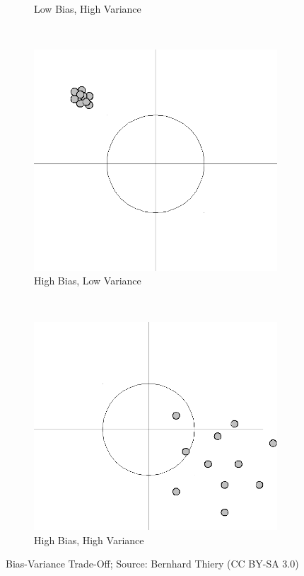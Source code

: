 \begin{figure}
\begin{subfigure}{0.3\linewidth}
					\caption{Low Bias, High Variance}
				\end{subfigure}
				\\[5pt]
				\begin{subfigure}{0.3\linewidth}
					\centering
					\includegraphics[width=\linewidth]{figures/high-bias-low-variance}
					\caption{High Bias, Low Variance}
				\end{subfigure}
				~
				\begin{subfigure}{0.3\linewidth}
					\centering
					\includegraphics[width=\linewidth]{figures/high-bias-high-variance}
					\caption{High Bias, High Variance}
				\end{subfigure}
				\caption[Bias-Variance Trade-Off]{Bias-Variance Trade-Off; Source: Bernhard Thiery (CC BY-SA 3.0)}
				\label{fig:biasVariance}
			\end{figure}

